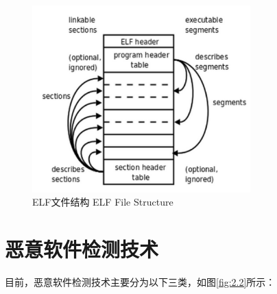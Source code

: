 \begin{figure}[hbt]
	\centering
	\includegraphics[width=0.75\textwidth]{figures/2.1}
	\caption{ELF文件结构 ELF File Structure}\label{fig:2.1}
\end{figure}

\section{恶意软件检测技术}

目前，恶意软件检测技术主要分为以下三类，如图\ref{fig:2.2}所示：

